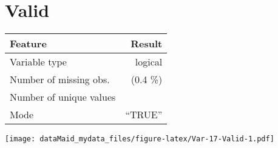 \documentclass[]{report}
\begin{document}
\noindent\makebox[\linewidth]{\rule{\textwidth}{0.4pt}}

\hypertarget{valid}{%
\section{Valid}\label{valid}}

\begin{minipage}{0.75 \textwidth}

\begin{longtable}[]{@{}lr@{}}
\toprule
\begin{minipage}[b]{0.34\columnwidth}\raggedright
Feature\strut
\end{minipage} & \begin{minipage}[b]{0.16\columnwidth}\raggedleft
Result\strut
\end{minipage}\tabularnewline
\midrule
\endhead
\begin{minipage}[t]{0.34\columnwidth}\raggedright
Variable type\strut
\end{minipage} & \begin{minipage}[t]{0.16\columnwidth}\raggedleft
logical\strut
\end{minipage}\tabularnewline
\begin{minipage}[t]{0.34\columnwidth}\raggedright
Number of missing obs.\strut
\end{minipage} & \begin{minipage}[t]{0.16\columnwidth}\raggedleft
1 (0.4 \%)\strut
\end{minipage}\tabularnewline
\begin{minipage}[t]{0.34\columnwidth}\raggedright
Number of unique values\strut
\end{minipage} & \begin{minipage}[t]{0.16\columnwidth}\raggedleft
2\strut
\end{minipage}\tabularnewline
\begin{minipage}[t]{0.34\columnwidth}\raggedright
Mode\strut
\end{minipage} & \begin{minipage}[t]{0.16\columnwidth}\raggedleft
``TRUE''\strut
\end{minipage}\tabularnewline
\bottomrule
\end{longtable}

\end{minipage}
\begin{minipage}{0.25 \textwidth}

\texttt{[image: dataMaid\_mydata\_files/figure-latex/Var-17-Valid-1.pdf]}

\end{minipage}
\end{document}
